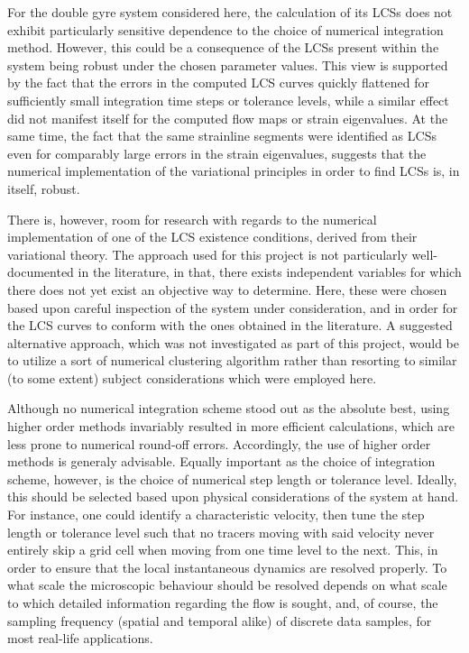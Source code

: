 For the double gyre system considered here, the calculation of its LCSs
does not exhibit particularly sensitive dependence to
the choice of numerical integration method. However, this could be a
consequence of the LCSs present within the system being robust under the chosen
parameter values. This view is supported by the fact that the errors in the
computed LCS curves quickly flattened for sufficiently small integration time
steps or tolerance levels, while a similar effect did not manifest itself for
the computed flow maps or strain eigenvalues. At the same time, the fact that
the same strainline segments were identified as LCSs even for comparably large
errors in the strain eigenvalues, suggests that the numerical implementation
of the variational principles in order to find LCSs is, in itself, robust.

There is, however, room for research with regards to the numerical
implementation of one of the LCS existence conditions, derived from their
variational theory. The approach used for this project is not particularly
well-documented in the literature, in that, there exists independent variables
for which there does not yet exist an objective way to determine. Here, these
were chosen based upon careful inspection of the system under consideration,
and in order for the LCS curves to conform with the ones obtained in the
literature. A suggested alternative approach, which was not investigated as
part of this project, would be to utilize a sort of numerical clustering
algorithm rather than resorting to similar (to some extent) subject
considerations which were employed here.

Although no numerical integration scheme stood out as the absolute best,
using higher order methods invariably resulted in more efficient calculations,
which are less prone to numerical round-off errors. Accordingly, the use of
higher order methods is generaly advisable. Equally important as the choice of
integration scheme, however, is the choice of numerical step length or tolerance
level. Ideally, this should be selected based upon physical considerations of
the system at hand. For instance, one could identify a characteristic velocity,
then tune the step length or tolerance level such that no tracers moving with
said velocity never entirely skip a grid cell when moving from one time level
to the next. This, in order to ensure that the local instantaneous dynamics
are resolved properly. To what scale the microscopic behaviour should be
resolved depends on what scale to which detailed information regarding the flow
is sought, and, of course, the sampling frequency (spatial and temporal alike)
of discrete data samples, for most real-life applications.

